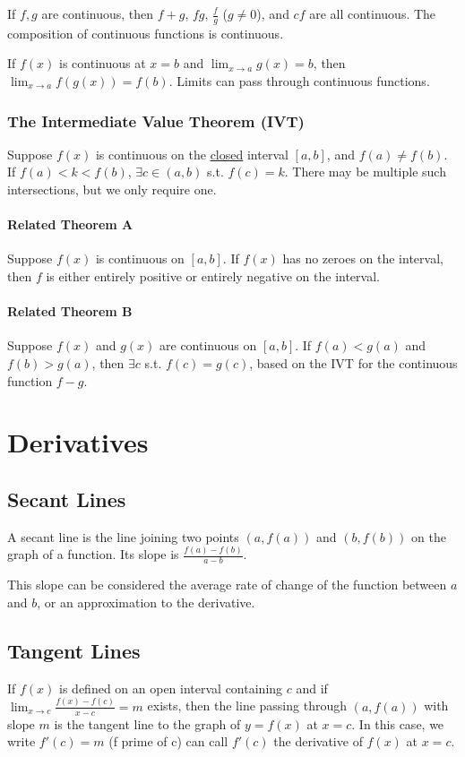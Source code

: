 \documentclass{article}
\begin{document}
If $f,g$ are continuous, then $f+g$, $fg$, $\frac{f}{g}$ ($g\ne0$), and $cf$ are all continuous. The composition of continuous functions is continuous.

If $f(x)$ is continuous at $x=b$ and $\lim_{x\to a}g(x) = b$, then $\lim_{x\to a}f(g(x)) = f(b)$. Limits can pass through continuous functions.

\subsubsection{The Intermediate Value Theorem (IVT)}
Suppose $f(x)$ is continuous on the \underline{closed} interval $[a,b]$, and $f(a)\ne f(b)$. If $f(a) < k < f(b)$, $\exists c \in (a,b)$ s.t. $f(c)=k$. There may be multiple such intersections, but we only require one.

\paragraph{Related Theorem A}
Suppose $f(x)$ is continuous on $[a,b]$. If $f(x)$ has no zeroes on the interval, then $f$ is either entirely positive or entirely negative on the interval.

\paragraph{Related Theorem B}
Suppose $f(x)$ and $g(x)$ are continuous on $[a,b]$. If $f(a) < g(a)$ and $f(b) > g(a)$, then $\exists c$ s.t. $f(c) = g(c)$, based on the IVT for the continuous function $f-g$.

\section{Derivatives}
\subsection{Secant Lines}
A secant line is the line joining two points $(a, f(a))$ and $(b, f(b))$ on the graph of a function. Its slope is $\frac{f(a)-f(b)}{a-b}$.

This slope can be considered the average rate of change of the function between $a$ and $b$, or an approximation to the derivative.


\subsection{Tangent Lines}
If $f(x)$ is defined on an open interval containing $c$ and if $\lim_{x\to c}\limits \frac{f(x) - f(c)}{x-c}=m$ exists, then the line passing through $(a, f(a))$ with slope $m$ is the tangent line to the graph of $y=f(x)$ at $x=c$. In this case, we write $f'(c) = m$ (f prime of c) can call $f'(c)$ the derivative of $f(x)$ at $x=c$.
\end{document}
